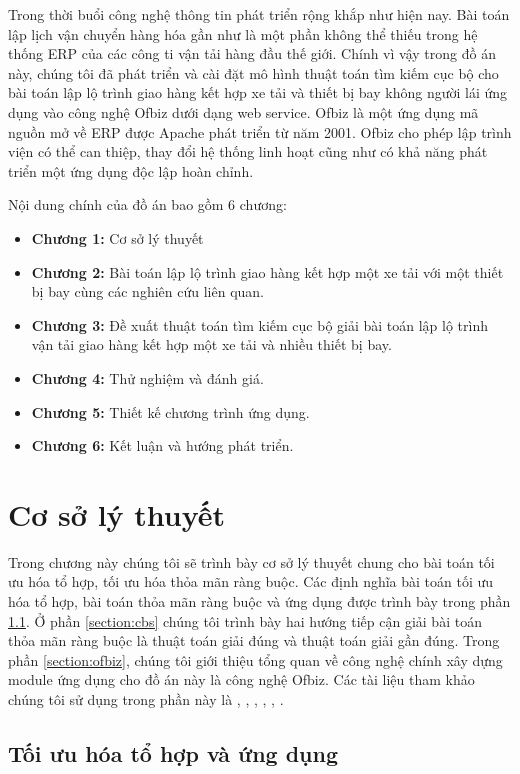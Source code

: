 \documentclass[a4paper,12pt]{report}
\begin{document}
Trong thời buổi công nghệ thông tin phát triển rộng khắp như hiện nay. Bài toán lập lịch vận chuyển hàng hóa gần như là một phần không thể thiếu trong hệ thống \ac{ERP} của các công ti vận tải hàng đầu thế giới. Chính vì vậy trong đồ án này, chúng tôi đã phát triển và cài đặt mô hình thuật toán tìm kiếm cục bộ cho bài toán lập lộ trình giao hàng kết hợp xe tải và thiết bị bay không người lái ứng dụng vào công nghệ Ofbiz dưới dạng web service. Ofbiz là một ứng dụng mã nguồn mở về \ac{ERP} được Apache phát triển từ năm 2001. Ofbiz cho phép lập trình viện có thể can thiệp, thay đổi hệ thống linh hoạt cũng như có khả năng phát triển một ứng dụng độc lập hoàn chỉnh. 

Nội dung chính của đồ án bao gồm 6 chương:
\begin{itemize}
\item \textbf{Chương 1:} Cơ sở lý thuyết
\item \textbf{Chương 2:} Bài toán lập lộ trình giao hàng kết hợp một xe tải với một thiết bị bay cùng các nghiên cứu liên quan.
\item \textbf{Chương 3:} Đề xuất thuật toán tìm kiếm cục bộ giải bài toán lập lộ trình vận tải giao hàng kết hợp một xe tải và nhiều thiết bị bay.
\item \textbf{Chương 4:} Thử nghiệm và đánh giá.
\item \textbf{Chương 5:} Thiết kế chương trình ứng dụng.
\item \textbf{Chương 6:} Kết luận và hướng phát  triển.
\end{itemize}

\chapter{Cơ sở lý thuyết}
Trong chương này chúng tôi sẽ trình bày cơ sở lý thuyết chung cho bài toán tối ưu hóa tổ hợp, tối ưu hóa thỏa mãn ràng buộc. Các định nghĩa bài toán tối ưu hóa tổ hợp, bài toán thỏa mãn ràng buộc và ứng dụng được trình bày trong phần \ref{section:cbo}. Ở phần \ref{section:cbs} chúng tôi trình bày hai hướng tiếp cận giải bài toán thỏa mãn ràng buộc là thuật toán giải đúng và thuật toán giải gần đúng. Trong phần \ref{section:ofbiz}, chúng tôi giới thiệu tổng quan về công nghệ chính xây dựng module ứng dụng cho đồ án này là công nghệ Ofbiz. Các tài liệu tham khảo chúng tôi sử dụng trong phần này là \cite{csplib30}, \cite{AIAMAB},  \cite{HCP}, \cite{IP},  \cite{TRR},  \cite{AOW}.
\section{Tối ưu hóa tổ hợp và ứng dụng}
\label{section:cbo}
\end{document}
